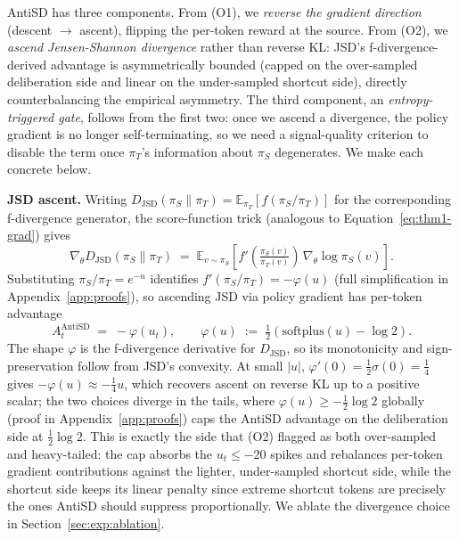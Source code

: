 \documentclass{article}
\begin{document}
AntiSD has three components. From (O1), we \emph{reverse the gradient direction} (descent $\to$ ascent), flipping the per-token reward at the source. From (O2), we \emph{ascend Jensen-Shannon divergence} rather than reverse KL: JSD's f-divergence-derived advantage is asymmetrically bounded (capped on the over-sampled deliberation side and linear on the under-sampled shortcut side), directly counterbalancing the empirical asymmetry. The third component, an \emph{entropy-triggered gate}, follows from the first two: once we ascend a divergence, the policy gradient is no longer self-terminating, so we need a signal-quality criterion to disable the term once $\pi_T$'s information about $\pi_S$ degenerates. We make each concrete below.

\textbf{JSD ascent.}
Writing $D_{\mathrm{JSD}}(\pi_S \| \pi_T) = \mathbb{E}_{\pi_T}[f(\pi_S/\pi_T)]$ for the corresponding f-divergence generator, the score-function trick (analogous to Equation~\eqref{eq:thm1-grad}) gives
\begin{equation}
  \label{eq:fdiv-grad}
  \nabla_\theta D_{\mathrm{JSD}}(\pi_S \| \pi_T) \;=\; \mathbb{E}_{v \sim \pi_S}\!\left[ f'\!\left(\tfrac{\pi_S(v)}{\pi_T(v)}\right) \, \nabla_\theta \log \pi_S(v) \right].
\end{equation}
Substituting $\pi_S/\pi_T = e^{-u}$ identifies $f'(\pi_S/\pi_T) = -\varphi(u)$ (full simplification in Appendix~\ref{app:proofs}), so ascending JSD via policy gradient has per-token advantage
\begin{equation}
  \label{eq:antisd-advantage}
  A_t^{\mathrm{AntiSD}} \;=\; -\varphi(u_t), \qquad \varphi(u) \;:=\; \tfrac{1}{2}\!\left(\mathrm{softplus}(u) - \log 2\right).
\end{equation}
The shape $\varphi$ is the f-divergence derivative for $D_{\mathrm{JSD}}$, so its monotonicity and sign-preservation follow from JSD's convexity. At small $|u|$, $\varphi'(0) = \tfrac{1}{2}\sigma(0) = \tfrac{1}{4}$ gives $-\varphi(u) \approx -\tfrac{1}{4} u$, which recovers ascent on reverse KL up to a positive scalar; the two choices diverge in the tails, where $\varphi(u) \ge -\tfrac{1}{2}\log 2$ globally (proof in Appendix~\ref{app:proofs}) caps the AntiSD advantage on the deliberation side at $\tfrac{1}{2}\log 2$. This is exactly the side that (O2) flagged as both over-sampled and heavy-tailed: the cap absorbs the $u_t \le -20$ spikes and rebalances per-token gradient contributions against the lighter, under-sampled shortcut side, while the shortcut side keeps its linear penalty since extreme shortcut tokens are precisely the ones AntiSD should suppress proportionally. We ablate the divergence choice in Section~\ref{sec:exp:ablation}.
\end{document}
